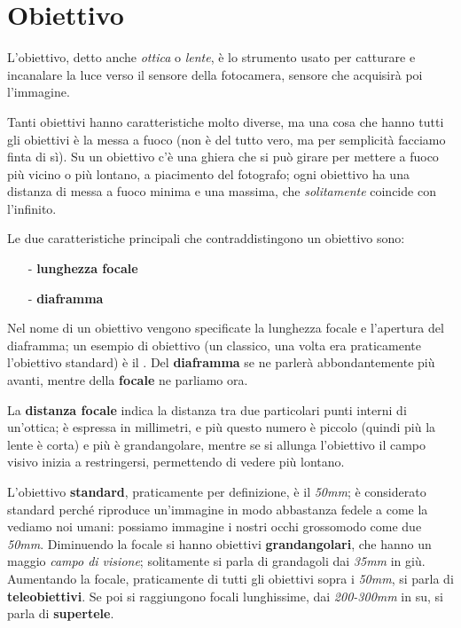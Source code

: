 \section{Obiettivo} \label{sec:obiettivo}

L'obiettivo, detto anche \textit{ottica} o \textit{lente}, è lo strumento usato per catturare e incanalare la
luce verso il sensore della fotocamera, sensore che acquisirà poi l'immagine.

Tanti obiettivi hanno caratteristiche molto diverse, ma una cosa che hanno tutti gli
obiettivi è la messa a fuoco (non è del tutto vero, ma per semplicità facciamo finta di sì).
Su un obiettivo c'è una ghiera che si può girare per mettere a fuoco più vicino o più
lontano, a piacimento del fotografo; ogni obiettivo ha una distanza di messa a fuoco
minima e una massima, che \textit{solitamente} coincide con l'infinito.

Le due caratteristiche principali che contraddistingono un obiettivo sono:
\begin{itemize}
    \item[-] \textbf{lunghezza focale}
    \item[-] \textbf{diaframma} 
\end{itemize}

Nel nome di un obiettivo vengono specificate la lunghezza focale e l'apertura del diaframma; un esempio di obiettivo (un classico, una volta era praticamente l'obiettivo standard) è il .\newline
Del \textbf{diaframma} se ne parlerà abbondantemente più avanti, mentre della \textbf{focale} ne parliamo ora.

La \textbf{distanza focale} indica la distanza tra due particolari punti interni di un'ottica; è
espressa in millimetri, e più questo numero è piccolo (quindi più la lente è corta) e più è
grandangolare, mentre se si allunga l'obiettivo il campo visivo inizia a restringersi,
permettendo di vedere più lontano.

L'obiettivo \textbf{standard}, praticamente per definizione, è il \textit{50mm}; è considerato standard perché riproduce un'immagine in modo abbastanza fedele a come la vediamo noi umani:
possiamo immagine i nostri occhi grossomodo come due \textit{50mm}.\newline
Diminuendo la focale si hanno obiettivi \textbf{grandangolari}, che hanno un maggio \textit{campo di visione}; solitamente si parla di grandagoli dai \textit{35mm} in giù.\newline
Aumentando la focale, praticamente di tutti gli obiettivi sopra i \textit{50mm}, si parla di \textbf{teleobiettivi}. Se poi si raggiungono focali lunghissime, dai \textit{200-300mm} in su, si parla di \textbf{supertele}.

